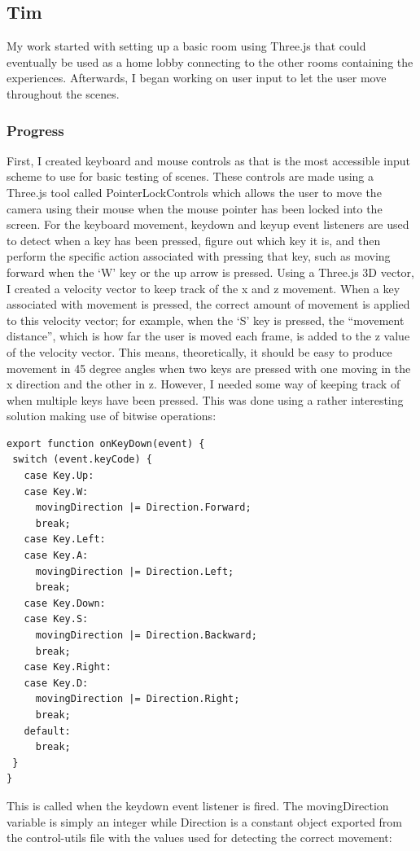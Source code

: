 \documentclass[onecolumn, draftclsnofoot,10pt, compsoc]{IEEEtran}
\begin{document}
\subsection{Tim}
My work started with setting up a basic room using Three.js that could eventually be used as a home lobby connecting to the other rooms containing the experiences. Afterwards, I began working on user input to let the user move throughout the scenes. 

\subsubsection{Progress}
First, I created keyboard and mouse controls as that is the most accessible input scheme to use for basic testing of scenes. These controls are made using a Three.js tool called PointerLockControls which allows the user to move the camera using their mouse when the mouse pointer has been locked into the screen. For the keyboard movement, keydown and keyup event listeners are used to detect when a key has been pressed, figure out which key it is, and then perform the specific action associated with pressing that key, such as moving forward when the ‘W’ key or the up arrow is pressed. Using a Three.js 3D vector, I created a velocity vector to keep track of the x and z movement. When a key associated with movement is pressed, the correct amount of movement is applied to this velocity vector; for example, when the ‘S’ key is pressed, the “movement distance”, which is how far the user is moved each frame, is added to the z value of the velocity vector. This means, theoretically, it should be easy to produce movement in 45 degree angles when two keys are pressed with one moving in the x direction and the other in z. However, I needed some way of keeping track of when multiple keys have been pressed. This was done using a rather interesting solution making use of bitwise operations: 

\begin{lstlisting}
export function onKeyDown(event) {
 switch (event.keyCode) {
   case Key.Up:
   case Key.W:
     movingDirection |= Direction.Forward;
     break;
   case Key.Left:
   case Key.A:
     movingDirection |= Direction.Left;
     break;
   case Key.Down:
   case Key.S:
     movingDirection |= Direction.Backward;
     break;
   case Key.Right:
   case Key.D:
     movingDirection |= Direction.Right;
     break;
   default:
     break;
 }
}
\end{lstlisting}

This is called when the keydown event listener is fired. The movingDirection variable is simply an integer while Direction is a constant object exported from the control-utils file with the values used for detecting the correct movement:
\end{document}
